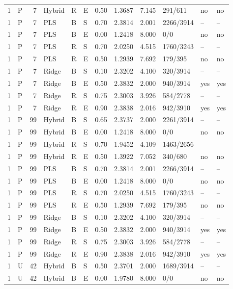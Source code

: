 \documentclass[10pt,a4paper]{article}
\begin{document}
\begin{longtable}{rlrlllrrrlll}
1 & P & 7 & Hybrid & R & E & 0.50 & 1.3687 & 7.145 & 291/611 & no & no \\
1 & P & 7 & PLS & B & S & 0.70 & 2.3814 & 2.001 & 2266/3914 & -- & -- \\
1 & P & 7 & PLS & B & E & 0.00 & 1.2418 & 8.000 & 0/0 & no & no \\
1 & P & 7 & PLS & R & S & 0.70 & 2.0250 & 4.515 & 1760/3243 & -- & -- \\
1 & P & 7 & PLS & R & E & 0.50 & 1.2939 & 7.692 & 179/395 & no & no \\
1 & P & 7 & Ridge & B & S & 0.10 & 2.3202 & 4.100 & 320/3914 & -- & -- \\
1 & P & 7 & Ridge & B & E & 0.50 & 2.3832 & 2.000 & 940/3914 & yes & yes \\
1 & P & 7 & Ridge & R & S & 0.75 & 2.3003 & 3.926 & 584/2778 & -- & -- \\
1 & P & 7 & Ridge & R & E & 0.90 & 2.3838 & 2.016 & 942/3910 & yes & yes \\
1 & P & 99 & Hybrid & B & S & 0.65 & 2.3737 & 2.000 & 2261/3914 & -- & -- \\
1 & P & 99 & Hybrid & B & E & 0.00 & 1.2418 & 8.000 & 0/0 & no & no \\
1 & P & 99 & Hybrid & R & S & 0.70 & 1.9452 & 4.109 & 1463/2656 & -- & -- \\
1 & P & 99 & Hybrid & R & E & 0.50 & 1.3922 & 7.052 & 340/680 & no & no \\
1 & P & 99 & PLS & B & S & 0.70 & 2.3814 & 2.001 & 2266/3914 & -- & -- \\
1 & P & 99 & PLS & B & E & 0.00 & 1.2418 & 8.000 & 0/0 & no & no \\
1 & P & 99 & PLS & R & S & 0.70 & 2.0250 & 4.515 & 1760/3243 & -- & -- \\
1 & P & 99 & PLS & R & E & 0.50 & 1.2939 & 7.692 & 179/395 & no & no \\
1 & P & 99 & Ridge & B & S & 0.10 & 2.3202 & 4.100 & 320/3914 & -- & -- \\
1 & P & 99 & Ridge & B & E & 0.50 & 2.3832 & 2.000 & 940/3914 & yes & yes \\
1 & P & 99 & Ridge & R & S & 0.75 & 2.3003 & 3.926 & 584/2778 & -- & -- \\
1 & P & 99 & Ridge & R & E & 0.90 & 2.3838 & 2.016 & 942/3910 & yes & yes \\
1 & U & 42 & Hybrid & B & S & 0.50 & 2.3701 & 2.000 & 1689/3914 & -- & -- \\
1 & U & 42 & Hybrid & B & E & 0.00 & 1.9780 & 8.000 & 0/0 & no & no \\

\end{longtable}
\end{document}
